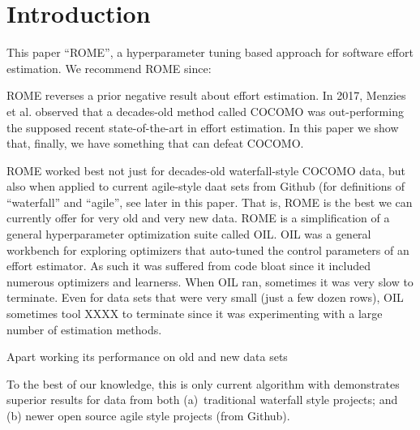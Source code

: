 


\maketitle

\section{Introduction}
\label{intro}


This paper  ``ROME'', a hyperparameter tuning based approach for software effort estimation. We recommend ROME since:
\bi
\item
ROME reverses
a prior negative result about effort estimation. In 2017, Menzies et al. observed that  a decades-old method
called COCOMO was out-performing the supposed recent state-of-the-art in effort estimation. In this paper we show that,
finally, we have something that can defeat COCOMO.
\item
ROME worked best not just for decades-old waterfall-style COCOMO data, but also when applied to current agile-style daat sets from Github (for definitions
of ``waterfall'' and ``agile'', see later in this paper.
That is, ROME is the best we can currently offer for very old and very new data.
\ei
ROME is a simplification of a general hyperparameter optimization suite called OIL. OIL was a general 
workbench for exploring optimizers that auto-tuned the control parameters of an effort estimator.
As such it was suffered from code bloat since it included numerous optimizers and learnerss. 
When OIL ran, sometimes it was very slow to terminate. Even for data sets that were very
small (just a few dozen rows), OIL sometimes tool XXXX to terminate since it was experimenting with a large
number of estimation methods. 

Apart working its performance on old and new data sets

To the best of our knowledge, this
is only current algorithm with demonstrates superior results for data from both (a)~traditional waterfall style projects;
and (b) newer  open source agile style projects (from Github).


